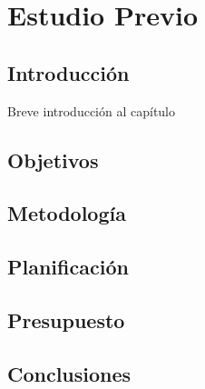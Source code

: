 \chapter{Estudio Previo}\label{cap:planificación}

\section{Introducción}
Breve introducción al capítulo

\section{Objetivos}

\section{Metodología}

\section{Planificación}

\section{Presupuesto}

\section{Conclusiones}